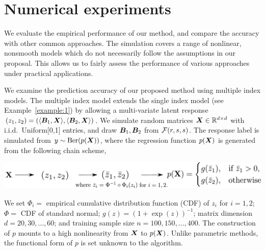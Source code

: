 \documentclass[11pt]{article}
\theoremstyle{definition}
\begin{document}
\vspace{-.3cm}
\section{Numerical experiments}\label{sec:data}
\vspace{-.5cm}
We evaluate the empirical performance of our method, and compare the accuracy with other common approaches. The simulation covers a range of nonlinear, nonsmooth models which do not necessarily follow the assumptions in our proposal. This allows us to fairly assess the performance of various approaches under practical applications. 

We examine the prediction accuracy of our proposed method using multiple index models. The multiple index model extends the single index model (see Example~\ref{example:1}) by allowing a multi-variate latent response $(z_1,z_2)=\left(\langle \bm B_1, \bm X \rangle,\langle \bm B_2, \bm X \rangle\right)$. We simulate random matrices $\bm X\in\mathbb{R}^{d\times d}$ with i.i.d.\ Uniform[0,1] entries, and draw $\bm B_1, \bm B_2$ from $\mathcal{F}(r,s,s)$. The response label is simulated from $y\sim \text{Ber}(p(\bm X))$, where the regression function $p(\bm X)$ is generated from the following chain scheme,

\vspace{.3cm}
\centerline{\includegraphics[width=.7\textwidth]{math.pdf}}
We set $\Phi_i = $ empirical cumulative distribution function (CDF) of $z_i$ for $i=1,2$; $\Phi = $ CDF of standard normal; $g(z)=(1+\exp(z))^{-1}$; matrix dimension $d=20,30,\ldots,60$; and training sample size $n=100, 150, \ldots, 400$. The construction of $p$ mounts to a high nonlinearity from $\bm X$ to $p(\bm X)$. Unlike parametric methods, the functional form of $p$ is set unknown to the algorithm. 
\end{document}

